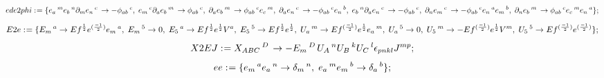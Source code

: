 \documentclass[11pt]{article}
\def\specialcolon{\mathrel{\mathop{:}}\hspace{-.5em}}
\begin{document}
\begin{dmath*}[compact, spread=2pt]
ede2phi\specialcolon{}= \{{e}_{a}\,^{m} {e}_{b}\,^{n} {\partial}_{m}{{e}_{n}\,^{c}}\,  \rightarrow -{\phi}_{a b}\,^{c},\; {e}_{m}\,^{c} {\partial}_{a}{{e}_{b}\,^{m}}\,  \rightarrow {\phi}_{a b}\,^{c},\; {\partial}_{a}{{e}_{b}\,^{m}}\,  \rightarrow {\phi}_{a b}\,^{c} {e}_{c}\,^{m},\; {\partial}_{a}{{e}_{n}\,^{c}}\,  \rightarrow -{\phi}_{a b}\,^{c} {e}_{n}\,^{b},\; {e}_{b}\,^{n} {\partial}_{a}{{e}_{n}\,^{c}}\,  \rightarrow -{\phi}_{a b}\,^{c},\; {\partial}_{n}{{e}_{m}\,^{c}}\,  \rightarrow -{\phi}_{a b}\,^{c} {e}_{n}\,^{a} {e}_{m}\,^{b},\; {\partial}_{n}{{e}_{b}\,^{m}}\,  \rightarrow {\phi}_{a b}\,^{c} {e}_{c}\,^{m} {e}_{n}\,^{a}\};
\end{dmath*}
\begin{dmath*}[compact, spread=2pt]
E2e\specialcolon{}= \{{E}_{m}\,^{a} \rightarrow Ef{}^{\frac{1}{2}} e{}^{(\frac{-1}{2})} {e}_{m}\,^{a},\; {E}_{m}\,^{5} \rightarrow 0,\; {E}_{5}\,^{a} \rightarrow Ef{}^{\frac{1}{2}} e{}^{\frac{1}{2}} {V}^{a},\; {E}_{5}\,^{5} \rightarrow Ef{}^{\frac{1}{2}} e{}^{\frac{1}{2}},\; {U}_{a}\,^{m} \rightarrow Ef{}^{(\frac{-1}{2})} e{}^{\frac{1}{2}} {e}_{a}\,^{m},\; {U}_{a}\,^{5} \rightarrow 0,\; {U}_{5}\,^{m} \rightarrow -Ef{}^{(\frac{-1}{2})} e{}^{\frac{1}{2}} {V}^{m},\; {U}_{5}\,^{5} \rightarrow Ef{}^{(\frac{-1}{2})} e{}^{(\frac{-1}{2})}\};
\end{dmath*}
\begin{dmath*}[compact, spread=2pt]
X2EJ\specialcolon{}= {X}_{A B C}\,^{D\, } \rightarrow -{E}_{m}\,^{D\, } {U}_{A}\,^{n} {U}_{B}\,^{k} {U}_{C}\,^{l} {\epsilon}_{p n k l} {J}^{m p};
\end{dmath*}
\begin{dmath*}[compact, spread=2pt]
ee\specialcolon{}= \{{e}_{m}\,^{a} {e}_{a}\,^{n} \rightarrow {\delta}_{m}\,^{n},\; {e}_{a}\,^{m} {e}_{m}\,^{b} \rightarrow {\delta}_{a}\,^{b}\};
\end{dmath*}
\end{document}
